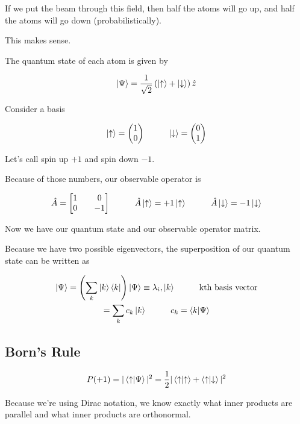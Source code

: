 \documentclass[fleqn]{report}
\newcommand{\hp}{\hspace{1cm}}
\newcommand{\equations} [1] {
\begin{gather*}
#1
\end{gather*}
}
\begin{document}
If we put the beam through this field, then half the atoms will go up, 
and half the atoms will go down (probabilistically).

This makes sense. 

The quantum state of each atom is given by 
\equations{
    \ket{\Psi}
    =
    \frac{1}{\sqrt{2}}
    \left(
        \ket{\uparrow}
        +
        \ket{\downarrow}
    \right)
    \hat z
}

Consider a basis 
\equations{
    \ket{\uparrow}
    =
    \begin{pmatrix} 1 \\ 0 \end{pmatrix}
    \hp
    \ket{\downarrow}
    =
    \begin{pmatrix} 0 \\ 1 \end{pmatrix}
}

Let's call spin up $+1$ and spin down $-1$. 

Because of those numbers, our observable operator is 
\equations{
    \hat A 
    =
    \begin{bmatrix}
        1 && 0 \\
        0 && -1
    \end{bmatrix}
    \hp 
    \hat A \ket{\uparrow}
    =
    + 1 \ket{\uparrow}
    \hp 
    \hat A \ket{\downarrow}
    =
    - 1 \ket{\downarrow}
}

Now we have our quantum state and our observable operator matrix. 

Because we have two possible eigenvectors, the superposition 
of our quantum state can be written as 

\equations{
    \ket{\Psi}
    =
    \left(
        \sum_k \ket{k} \bra{k}
    \right)
    \ket{\Psi}
    \equiv 
    \mathbb{\lambda}_i
    , 
    \ket{k}
    \hp 
    \textrm{kth basis vector}
    \\
    =
    \sum_k 
    c_k \ket{k}
    \hp 
    c_k = \bra{k}\ket{\Psi}
}

\subsection{Born's Rule}
\equations{
    P(+1)
    =
    |\bra{\uparrow}\ket{\Psi}|^2
    =
    \frac{1}{2}
    |\bra{\uparrow}\ket{\uparrow}
    +
    \bra{\uparrow}\ket{\downarrow}|^2
}

Because we're using Dirac notation, we know exactly what inner products
are parallel and what inner products are orthonormal.
\end{document}
